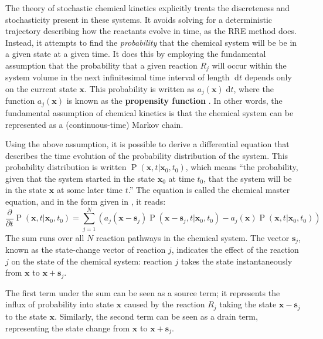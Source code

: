 \documentclass[english,letterpaper,12pt]{report}
\newcommand{\defkeywd}[1]{\textbf{#1}}
\newcommand{\dee}{\;\mathrm{d}}
\renewcommand{\vec}[1]{\ensuremath{\mathbf{#1}}}
\DeclareMathOperator{\Prob}{P}
\begin{document}
\begin{doublespacing}
The theory of stochastic chemical kinetics explicitly treats the discreteness and stochasticity present in these systems. It avoids solving for a deterministic trajectory describing how the reactants evolve in time, as the RRE method does. Instead, it attempts to find the \emph{probability} that the chemical system will be be in a given state at a given time. It does this by employing the fundamental assumption that the probability that a given reaction $R_j$ will occur within the system volume in the next infinitesimal time interval of length $\dee t$ depends only on the current state $\vec{x}$. This probability is written as $a_j(\vec{x}) \dee t$, where the function $a_j(\vec{x})$ is known as the \defkeywd{propensity function} \cite{gillespie-ssa}. In other words, the fundamental assumption of chemical kinetics is that the chemical system can be represented as a (continuous-time) Markov chain.

Using the above assumption, it is possible to derive a differential equation that describes the time evolution of the probability distribution of the system. This probability distribution is written $\Prob(\vec{x}, t | \vec{x}_0, t_0)$, which means ``the probability, given that the system started in the state $\vec{x}_0$ at time $t_0$, that the system will be in the state $\vec{x}$ at some later time $t$.'' The equation is called the chemical master equation, and in the form given in \cite{gillespie-ssa}, it reads:
\begin{equation}
    \frac{\partial}{\partial t} \Prob(\vec{x}, t | \vec{x}_0, t_0) = \sum_{j=1}^N \left( a_j (\vec{x} - \vec{s}_j) \Prob(\vec{x} - \vec{s}_j, t | \vec{x}_0, t_0) - a_j(\vec{x}) \Prob(\vec{x}, t | \vec{x}_0, t_0) \right)
    \label{eq:master-eqn-gillespie}
\end{equation}
The sum runs over all $N$ reaction pathways in the chemical system. The vector $\vec{s}_j$, known as the state-change vector of reaction $j$, indicates the effect of the reaction $j$ on the state of the chemical system: reaction $j$ takes the state instantaneously from $\vec{x}$ to $\vec{x} + \vec{s}_j$.

The first term under the sum can be seen as a source term; it represents the influx of probability into state $\vec{x}$ caused by the reaction $R_j$ taking the state $\vec{x} - \vec{s}_j$ to the state $\vec{x}$. Similarly, the second term can be seen as a drain term, representing the state change from $\vec{x}$ to $\vec{x} + \vec{s}_j$.


\end{doublespacing}
\end{document}
